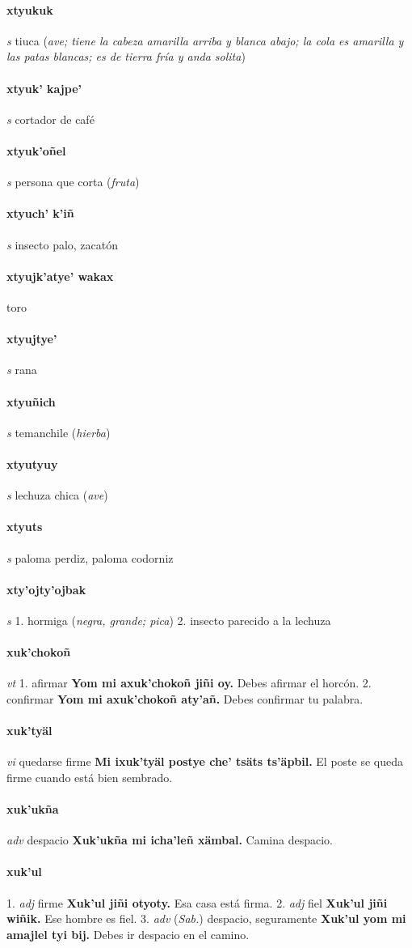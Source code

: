 \documentclass{scrbook}
\newcommand{\entry}[1]{\paragraph{#1}}
\newcommand{\onedefinition}[1]{#1.}
\newcommand{\partofspeech}[1]{\textit{#1}}
\newcommand{\spanishtranslation}[1]{#1}
\newcommand{\clarification}[1]{(\textit{#1})}
\newcommand{\cholexample}[1]{\textbf{#1}}
\newcommand{\exampletranslation}[1]{#1}
\newcommand{\relevantdialect}[1]{(\textit{#1})}
\begin{document}
\begin{multicols}{2}
\entry{xtyukuk}
\partofspeech{s}
\spanishtranslation{tiuca}
\clarification{ave; tiene la cabeza amarilla arriba y blanca abajo; la cola es amarilla y las patas blancas; es de tierra fría y anda solita}

\entry{xtyuk' kajpe'}
\partofspeech{s}
\spanishtranslation{cortador de café}

\entry{xtyuk'oñel}
\partofspeech{s}
\spanishtranslation{persona que corta}
\clarification{fruta}

\entry{xtyuch' k'iñ}
\partofspeech{s}
\spanishtranslation{insecto palo, zacatón}

\entry{xtyujk'atye' wakax}
\spanishtranslation{toro}

\entry{xtyujtye'}
\partofspeech{s}
\spanishtranslation{rana}

\entry{xtyuñich}
\partofspeech{s}
\spanishtranslation{temanchile}
\clarification{hierba}

\entry{xtyutyuy}
\partofspeech{s}
\spanishtranslation{lechuza chica}
\clarification{ave}

\entry{xtyuts}
\partofspeech{s}
\spanishtranslation{paloma perdiz, paloma codorniz}

\entry{xty'ojty'ojbak}
\partofspeech{s}
\onedefinition{1}
\spanishtranslation{hormiga}
\clarification{negra, grande; pica}
\onedefinition{2}
\spanishtranslation{insecto parecido a la lechuza}

\entry{xuk'chokoñ}
\partofspeech{vt}
\onedefinition{1}
\spanishtranslation{afirmar}
\cholexample{Yom mi axuk'chokoñ jiñi oy.}
\exampletranslation{Debes afirmar el horcón.}
\onedefinition{2}
\spanishtranslation{confirmar}
\cholexample{Yom mi axuk'chokoñ aty'añ.}
\exampletranslation{Debes confirmar tu palabra.}

\entry{xuk'tyäl}
\partofspeech{vi}
\spanishtranslation{quedarse firme}
\cholexample{Mi ixuk'tyäl postye che' tsäts ts'äpbil.}
\exampletranslation{El poste se queda firme cuando está bien sembrado.}

\entry{xuk'ukña}
\partofspeech{adv}
\spanishtranslation{despacio}
\cholexample{Xuk'ukña mi icha'leñ xämbal.}
\exampletranslation{Camina despacio.}

\entry{xuk'ul}
\onedefinition{1}
\partofspeech{adj}
\spanishtranslation{firme}
\cholexample{Xuk'ul jiñi otyoty.}
\exampletranslation{Esa casa está firma.}
\onedefinition{2}
\partofspeech{adj}
\spanishtranslation{fiel}
\cholexample{Xuk'ul jiñi wiñik.}
\exampletranslation{Ese hombre es fiel.}
\onedefinition{3}
\partofspeech{adv}
\relevantdialect{Sab.}
\spanishtranslation{despacio, seguramente}
\cholexample{Xuk'ul yom mi amajlel tyi bij.}
\exampletranslation{Debes ir despacio en el camino.}


\end{multicols}
\end{document}
